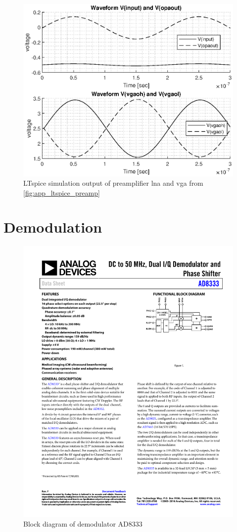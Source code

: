 \begin{figure}[htbp]
	\centering
	\includegraphics[width=.8\textwidth]{Figures/3_preamplifier_sim_out.eps}
	\caption{LTspice simulation output of preamplifier \gls{lna} and \gls{vga} from \cref{fig:app_ltspice_preamp}}
	\label{fig:4_preamplifier_sim}
\end{figure}

\section{Demodulation}
\begin{figure}[htbp]
	\centering
	\includegraphics[width=.8\textwidth]{Figures/3_ad8333_block.pdf}
	\caption{Block diagram of demodulator AD8333 \cite{AD8333}}
	\label{fig:3_demodulator_block}
\end{figure}

